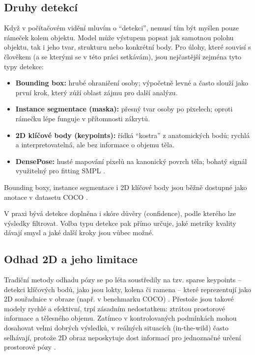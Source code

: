 \documentclass[11pt,a4paper,twoside,openright]{report}
\begin{document}
\subsection{Druhy detekcí}

Když v počítačovém vidění mluvím o \enquote{detekci}, nemusí tím být myšlen pouze rámeček kolem objektu. Model může výstupem popsat jak samotnou polohu objektu, tak i jeho tvar, strukturu nebo konkrétní body. Pro úlohy, které souvisí s člověkem (a se kterými se v této práci setkávám), jsou nejčastější zejména tyto typy detekce:

\begin{itemize}
    \item \textbf{Bounding box:} hrubé ohraničení osoby; výpočetně levné a často slouží jako první krok, který zúží oblast zájmu pro další analýzu.
    \item \textbf{Instance segmentace (maska):} přesný tvar osoby po pixelech; oproti rámečku lépe funguje v přítomnosti zákrytů.
    \item \textbf{2D klíčové body (keypoints):} řídká \enquote{kostra} z anatomických bodů; rychlá a interpretovatelná, ale bez informace o objemu těla.
    \item \textbf{DensePose:} husté mapování pixelů na kanonický povrch těla; bohatý signál využitelný pro fitting SMPL \cite{guler2018densepose}.
\end{itemize}

Bounding boxy, instance segmentace i 2D klíčové body jsou běžně dostupné jako anotace v datasetu COCO \cite{lin2014microsoft}.

V praxi bývá detekce doplněna i skóre důvěry (confidence), podle kterého lze výsledky filtrovat. Volba typu detekce pak přímo určuje, jaké metriky kvality dávají smysl a jaké další kroky jsou vůbec možné.


\subsection{Odhad 2D a jeho limitace}

Tradiční metody odhadu pózy se po léta soustředily na tzv. sparse keypoints -- detekci klíčových bodů, jako jsou lokty, kolena či ramena -- které reprezentují jako 2D souřadnice v obraze (např. v benchmarku COCO) \cite{lin2014microsoft}. Přestože jsou takové modely rychlé a efektivní, trpí zásadním nedostatkem: ztrátou prostorové informace a tělesného objemu. Zatímco v kontrolovaných podmínkách mohou dosahovat velmi dobrých výsledků, v reálných situacích (in-the-wild) často selhávají, protože 2D obraz neposkytuje dost informací pro jednoznačné určení prostorové pózy \cite{pavlakos2019expressive,wang2024prompthmr}.
\end{document}
